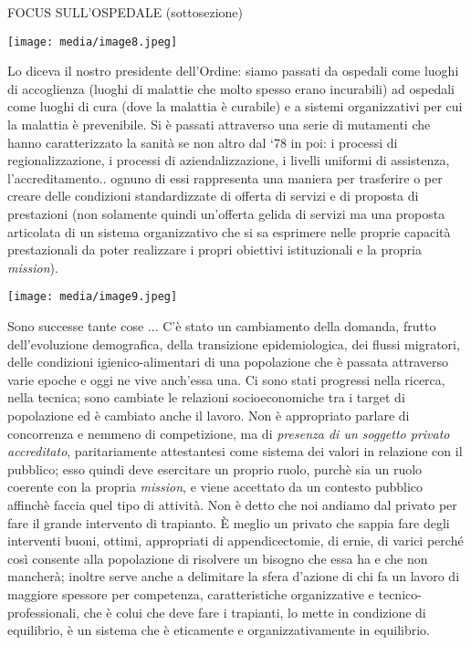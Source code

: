 \documentclass[]{article}
\begin{document}
FOCUS SULL'OSPEDALE (sottosezione)

\texttt{[image: media/image8.jpeg]}

Lo diceva il nostro presidente dell'Ordine: siamo passati da ospedali
come luoghi di accoglienza (luoghi di malattie che molto spesso erano
incurabili) ad ospedali come luoghi di cura (dove la malattia è
curabile) e a sistemi organizzativi per cui la malattia è prevenibile.
Si è passati attraverso una serie di mutamenti che hanno caratterizzato
la sanità se non altro dal `78 in poi: i processi di regionalizzazione,
i processi di aziendalizzazione, i livelli uniformi di assistenza,
l'accreditamento.. ognuno di essi rappresenta una maniera per trasferire
o per creare delle condizioni standardizzate di offerta di servizi e di
proposta di prestazioni (non solamente quindi un'offerta gelida di
servizi ma una proposta articolata di un sistema organizzativo che si sa
esprimere nelle proprie capacità prestazionali da poter realizzare i
propri obiettivi istituzionali e la propria \emph{mission}).

\texttt{[image: media/image9.jpeg]}

Sono successe tante cose ... C'è stato un cambiamento della domanda,
frutto dell'evoluzione demografica, della transizione epidemiologica,
dei flussi migratori, delle condizioni igienico-alimentari di una
popolazione che è passata attraverso varie epoche e oggi ne vive
anch'essa una. Ci sono stati progressi nella ricerca, nella tecnica;
sono cambiate le relazioni socioeconomiche tra i target di popolazione
ed è cambiato anche il lavoro. Non è appropriato parlare di concorrenza
e nemmeno di competizione, ma di \emph{presenza di un soggetto privato
accreditato}, paritariamente attestantesi come sistema dei valori in
relazione con il pubblico; esso quindi deve esercitare un proprio ruolo,
purchè sia un ruolo coerente con la propria \emph{mission}, e viene
accettato da un contesto pubblico affinchè faccia quel tipo di attività.
Non è detto che noi andiamo dal privato per fare il grande intervento di
trapianto. È meglio un privato che sappia fare degli interventi buoni,
ottimi, appropriati di appendicectomie, di ernie, di varici perché così
consente alla popolazione di risolvere un bisogno che essa ha e che non
mancherà; inoltre serve anche a delimitare la sfera d'azione di chi fa
un lavoro di maggiore spessore per competenza, caratteristiche
organizzative e tecnico-professionali, che è colui che deve fare i
trapianti, lo mette in condizione di equilibrio, è un sistema che è
eticamente e organizzativamente in equilibrio.
\end{document}
